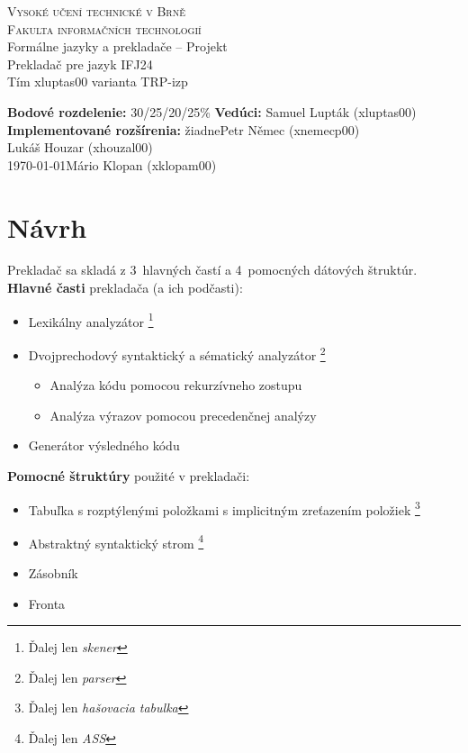 \documentclass[Slovak, a4paper, 12pt]{article}
\begin{document}
	\begin{titlepage}
		
		\begin{center}
			\textsc{{\LARGE Vysoké učení technické v Brně \\[0.5em]}  {\LARGE Fakulta informačních technologií}} \\
			{\Large Formálne jazyky a prekladače  -- Projekt \\[0.6em]}
			{\huge Prekladač pre jazyk IFJ24} \\[0.6em]
			{\large Tím xluptas00 varianta TRP-izp}
			
		\end{center}
		\begin{flushright}
			{ \textbf{Bodové rozdelenie:} 30/25/20/25\% \hfill \textbf{Vedúci: }Samuel Lupták (xluptas00)} \\
			{ \textbf{Implementované rozšírenia:} žiadne\hfill  Petr Němec (xnemecp00)} \\
			{ \hfill  Lukáš Houzar (xhouzal00)} \\
			{\today \hfill Mário Klopan (xklopam00)}
		\end{flushright}
		
	\end{titlepage}
	
	\section{Návrh}
	\noindent Prekladač sa skladá z 3~hlavných častí a 4~pomocných dátových štruktúr.\\
	\textbf{Hlavné časti} prekladača (a ich podčasti):
	\begin{itemize}
		\item Lexikálny analyzátor \footnote[1]{Ďalej len \textit{skener}}
		\item Dvojprechodový syntaktický a sématický analyzátor \footnote[2]{Ďalej len \textit{parser}}
		\begin{itemize} 
			\item Analýza kódu pomocou rekurzívneho zostupu
			\item Analýza výrazov pomocou precedenčnej analýzy
		\end{itemize}
		\item Generátor výsledného kódu
	\end{itemize}
	
	\noindent\textbf{Pomocné štruktúry} použité v prekladači:
		\begin{itemize}
		\item  Tabuľka s rozptýlenými položkami s implicitným zreťazením položiek \footnote[3]{Ďalej len \textit{hašovacia tabulka}}
		\item Abstraktný syntaktický strom \footnote[4]{Ďalej len \textit{ASS}}
		\item Zásobník
		\item Fronta
	\end{itemize}
	
\end{document}
